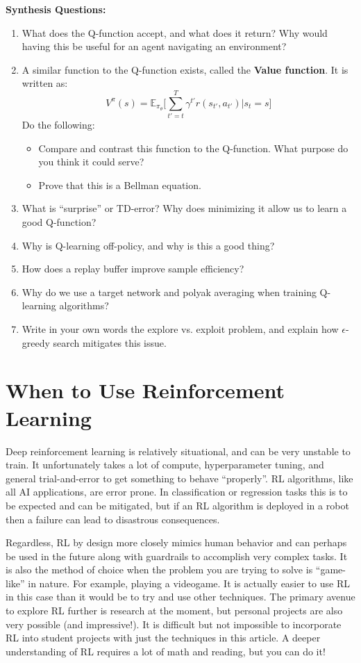 \begin{questionbox}
\textbf{Synthesis Questions:}
\begin{enumerate}
    \item What does the Q-function accept, and what does it return? Why would having this be useful for an agent navigating an environment?
    \item A similar function to the Q-function exists, called the \textbf{Value function}. It is written as:
    $$V^\pi(s) = \mathbb{E}_{\pi_\theta} \biggl[ \sum_{t' = t}^T \gamma^{t'}r(s_{t'}, a_{t'}) | s_t = s\biggr]$$
    Do the following:
    \begin{itemize}
        \item Compare and contrast this function to the Q-function. What purpose do you think it could serve?
        \item Prove that this is a Bellman equation.
    \end{itemize}
    \item What is ``surprise'' or TD-error? Why does minimizing it allow us to learn a good Q-function?
    \item Why is Q-learning off-policy, and why is this a good thing?
    \item How does a replay buffer improve sample efficiency?
    \item Why do we use a target network and polyak averaging when training Q-learning algorithms?
    \item Write in your own words the explore vs. exploit problem, and explain how $\epsilon$-greedy search mitigates this issue.
\end{enumerate}
\end{questionbox}

\section{When to Use Reinforcement Learning}
    \large Deep reinforcement learning is relatively situational, and can be very unstable to train. It unfortunately takes a lot of compute, hyperparameter tuning, and general trial-and-error to get something to behave ``properly''. RL algorithms, like all AI applications, are error prone. In classification or regression tasks this is to be expected and can be mitigated, but if an RL algorithm is deployed in a robot then a failure can lead to disastrous consequences. 
    
    Regardless, RL by design more closely mimics human behavior and can perhaps be used in the future along with guardrails to accomplish very complex tasks. It is also the method of choice when the problem you are trying to solve is ``game-like'' in nature. For example, playing a videogame. It is actually easier to use RL in this case than it would be to try and use other techniques. The primary avenue to explore RL further is research at the moment, but personal projects are also very possible (and impressive!). It is difficult but not impossible to incorporate RL into student projects with just the techniques in this article. A deeper understanding of RL requires a lot of math and reading, but you can do it!

